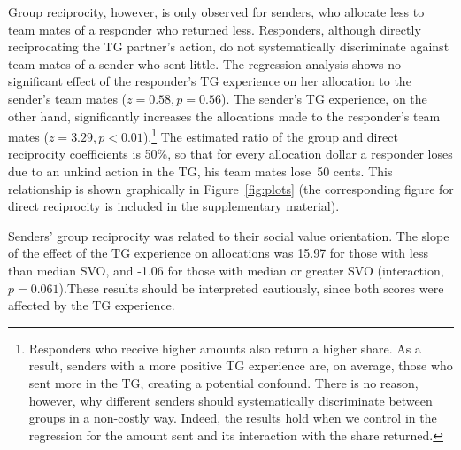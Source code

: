 \documentclass[12pt,a4paper]{article}\usepackage[]{graphicx}\usepackage[]{color}
\begin{document}
Group reciprocity, however, is only observed for senders, who allocate
less to team mates of a responder who returned less.
Responders,  although directly reciprocating the
TG partner's action, do not systematically discriminate against team mates
of a sender who sent little. The regression analysis shows no significant
effect of the responder's TG experience on her allocation to the sender's
team mates ($z=0.58,p= 0.56$). 
The sender's TG experience, on the other
hand, significantly increases the allocations made to the responder's team mates 
($z=3.29,p< 0.01$).\footnote{
  Responders who receive higher amounts also return a higher share. As a result, senders with a more positive TG experience are, on average, those who sent more in the TG, creating a potential confound. There is no reason, however, why different senders should systematically discriminate between groups in a non-costly way. Indeed, the results hold when we control in the regression for the amount sent and its interaction with the share returned.
}
The estimated ratio of the group and direct reciprocity coefficients
is 50\%, so that for every allocation dollar a responder
loses due to an unkind action in the TG, his team mates lose~50 cents. 
This relationship is shown graphically in Figure~\ref{fig:plots} (the corresponding figure for direct reciprocity is 
included in the supplementary material).




Senders' group reciprocity was related to their social value orientation. The slope of the effect of the TG experience 
on allocations was 
15.97 for those with less than median SVO, and 
-1.06 for those with median or greater SVO 
(interaction, $p= 0.061$).These results should be interpreted cautiously, since both scores were 
affected by the TG experience. 
\end{document}
